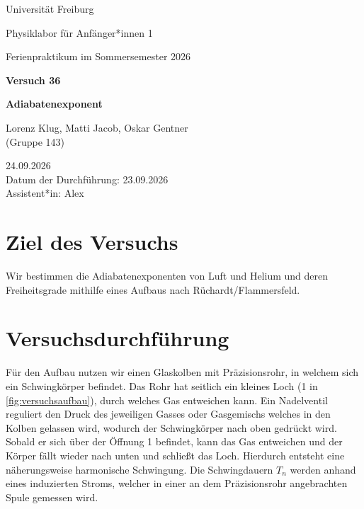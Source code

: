 \documentclass[12pt,a4paper]{article}
\begin{document}
\begin{titlepage}
    \centering
    \vspace*{2cm}

    {\Large Universität Freiburg\par}
    \vspace{0.5cm}
    {\large Physiklabor für Anfänger*innen 1\par}
    \vspace{1cm}
    {\large Ferienpraktikum im Sommersemester 2026\par}

    \vspace{2cm}

    {\huge\bfseries Versuch 36\par}
    \vspace{0.5cm}
    {\LARGE \bf{Adiabatenexponent}\par}

    \vfill

    {\large
    Lorenz Klug, Matti Jacob, Oskar Gentner\\
    (Gruppe 143)
    \par}

    \vspace{1cm}

    {\large
    24.09.2026\\
    Datum der Durchführung: 23.09.2026\\
    Assistent*in: Alex
    \par}
\end{titlepage}

\tableofcontents
\newpage

\section{Ziel des Versuchs}

Wir bestimmen die Adiabatenexponenten von Luft und Helium und deren Freiheitsgrade mithilfe eines Aufbaus nach Rüchardt/Flammersfeld.

\section{Versuchsdurchführung}

Für den Aufbau nutzen wir einen Glaskolben mit Präzisionsrohr, in welchem sich ein Schwingkörper befindet. Das Rohr hat seitlich ein kleines Loch (1 in \cref{fig:versuchsaufbau}), durch welches Gas entweichen kann. Ein Nadelventil reguliert den Druck des jeweiligen Gasses oder Gasgemischs welches in den Kolben gelassen wird, wodurch der Schwingkörper nach oben gedrückt wird. Sobald er sich über der Öffnung 1 befindet, kann das Gas entweichen und der Körper fällt wieder nach unten und schließt das Loch. Hierdurch entsteht eine näherungsweise harmonische Schwingung. Die Schwingdauern $T_n$ werden anhand eines induzierten Stroms, welcher in einer an dem Präzisionsrohr angebrachten Spule gemessen wird.
\end{document}
